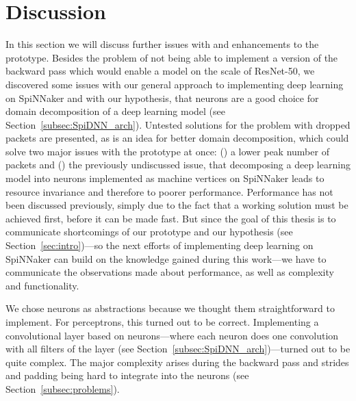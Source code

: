 \documentclass[]{article}
\begin{document}



\section{Discussion} %
\label{sec:discussion}

In this section we will discuss further issues with and enhancements
to the prototype.
Besides the problem of not being able to implement a version of the
backward pass which would enable a model on the scale of ResNet-50,
we discovered some issues with our general approach to implementing
deep learning on SpiNNaker and with our hypothesis, that neurons
are a good choice for domain decomposition of a deep learning model
(see Section~\ref{subsec:SpiDNN_arch}).
Untested solutions for the problem with dropped packets are presented,
as is an idea for better domain decomposition, which could solve two
major issues with the prototype at once:
() a lower peak number of packets and ()
the previously undiscussed issue, that decomposing a deep learning
model into neurons implemented as machine vertices on SpiNNaker leads
to resource invariance and therefore to poorer performance.
Performance has not been discussed previously, simply due to the
fact that a working solution must be achieved first, before it can
be made fast.
But since the goal of this thesis is to communicate shortcomings of
our prototype and our hypothesis (see Section~\ref{sec:intro})---so
the next efforts of implementing deep learning on SpiNNaker can build
on the knowledge gained during this work---we have to communicate the
observations made about performance, as well as complexity and
functionality.

We chose neurons as abstractions because we thought them
straightforward to implement.
For perceptrons, this turned out to be correct.
Implementing a convolutional layer based on neurons---where each
neuron does one convolution with all filters of the layer
(see Section~\ref{subsec:SpiDNN_arch})---turned out to be quite
complex.
The major complexity arises during the backward pass and strides and
padding being hard to integrate into the neurons (see
Section~\ref{subsec:problems}).
\end{document}
